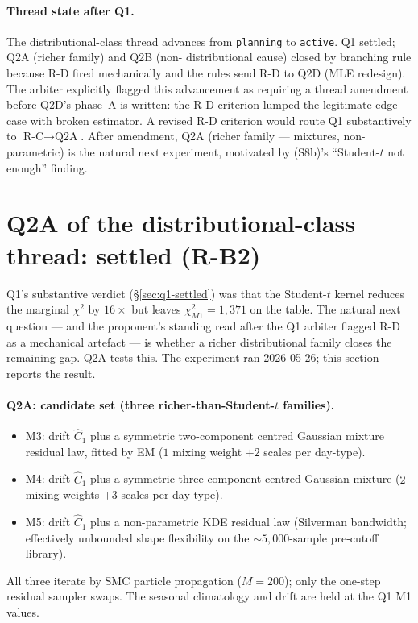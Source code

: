 \documentclass[11pt]{article}
\theoremstyle{definition}
\theoremstyle{plain}
\begin{document}
\paragraph{Thread state after Q1.}
The distributional-class thread advances from \texttt{planning}
to \texttt{active}. Q1 settled; Q2A (richer family) and Q2B (non-
distributional cause) closed by branching rule because R-D fired
mechanically and the rules send R-D to Q2D (MLE redesign). The
arbiter explicitly flagged this advancement as requiring a thread
amendment before Q2D's phase~A is written: the R-D criterion lumped
the legitimate edge case with broken estimator. A revised R-D
criterion would route Q1 substantively to $\text{R-C} \to \text{Q2A}$.
After amendment, Q2A (richer family --- mixtures, non-parametric)
is the natural next experiment, motivated by (S8b)'s ``Student-$t$
not enough'' finding.

\section{Q2A of the distributional-class thread: settled (R-B2)}
\label{sec:q2a-settled}

Q1's substantive verdict (\S\ref{sec:q1-settled}) was that the
Student-$t$ kernel reduces the marginal $\chi^{2}$ by $16\times$
but leaves $\chi^{2}_{M1} = 1{,}371$ on the table. The natural next
question --- and the proponent's standing read after the Q1 arbiter
flagged R-D as a mechanical artefact --- is whether a richer
distributional family closes the remaining gap. Q2A tests this.
The experiment ran 2026-05-26; this section reports the result.

\paragraph{Q2A: candidate set (three richer-than-Student-$t$ families).}
\begin{itemize}[leftmargin=2em]
\item M3: drift $\hat C_1$ plus a symmetric two-component centred
Gaussian mixture residual law, fitted by EM ($1$ mixing weight $+ 2$
scales per day-type).
\item M4: drift $\hat C_1$ plus a symmetric three-component centred
Gaussian mixture ($2$ mixing weights $+ 3$ scales per day-type).
\item M5: drift $\hat C_1$ plus a non-parametric KDE residual law
(Silverman bandwidth; effectively unbounded shape flexibility on
the $\sim 5{,}000$-sample pre-cutoff library).
\end{itemize}
All three iterate by SMC particle propagation ($M = 200$); only the
one-step residual sampler swaps. The seasonal climatology and drift
are held at the Q1 M1 values.
\end{document}

